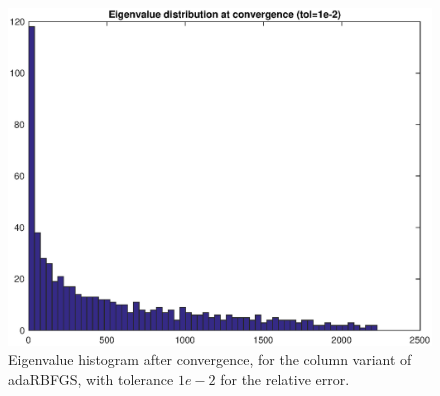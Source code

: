 \documentclass[12pt,conference,compsocconf]{IEEEtran}
\begin{document}
\begin{figure}[H]
  \centering
  \includegraphics[height=0.7\columnwidth,width=1.0\columnwidth]{eigdisttol2.eps}
  
  \vspace{-2mm}
  \caption{Eigenvalue histogram after convergence, for the column variant of adaRBFGS, with tolerance $1e-2$ for the relative error. \label{fig:eighist2}}  
  
\end{figure}
\end{document}
